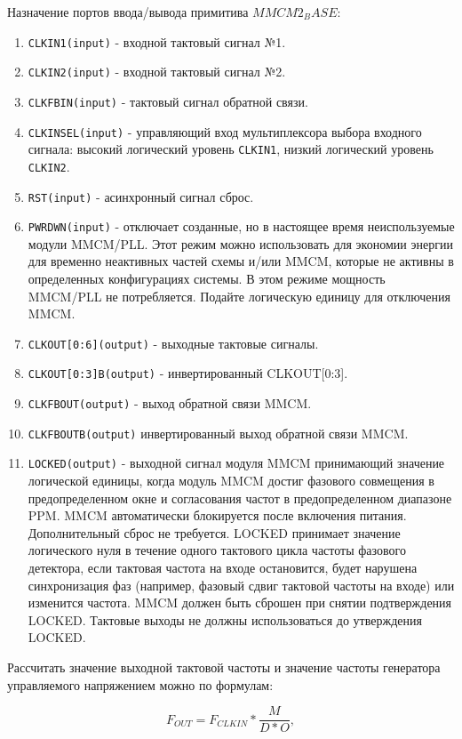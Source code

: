 \documentclass[a4paper,oneside ,14pt]{extreport}
\begin{document}
Назначение портов ввода/вывода примитива \(MMCM2_BASE\):

\begin{enumerate}
	\item \verb|CLKIN1(input)| - входной тактовый сигнал №1. 
	\item \verb|CLKIN2(input)| - входной тактовый сигнал №2.
	\item \verb|CLKFBIN(input)| - тактовый сигнал обратной связи.
	\item \verb|CLKINSEL(input)| - управляющий вход мультиплексора выбора входного сигнала: высокий логический уровень \verb|CLKIN1|, 
	низкий логический уровень \verb|CLKIN2|. 
	\item \verb|RST(input)| - асинхронный сигнал сброс.
	\item \verb|PWRDWN(input)| - отключает созданные, но в настоящее время неиспользуемые модули MMCM/PLL. Этот режим можно использовать для экономии энергии для временно неактивных частей схемы и/или MMCM, которые не активны в определенных конфигурациях системы. В этом режиме мощность MMCM/PLL не потребляется. Подайте логическую единицу для отключения MMCM. 
	\item \verb|CLKOUT[0:6](output)| - выходные тактовые сигналы.
	\item \verb|CLKOUT[0:3]B(output)| - инвертированный CLKOUT[0:3].
	\item \verb|CLKFBOUT(output)| - выход обратной связи MMCM.
	\item \verb|CLKFBOUTB(output)| инвертированный выход обратной связи MMCM.
	\item \verb|LOCKED(output)| - выходной сигнал модуля MMCM принимающий значение логической единицы, когда модуль MMCM достиг фазового совмещения в предопределенном окне и согласования частот в предопределенном диапазоне PPM. MMCM автоматически блокируется после включения питания. Дополнительный сброс не требуется. LOCKED принимает значение логического нуля в течение одного тактового цикла частоты фазового детектора, если тактовая частота на входе остановится, будет нарушена синхронизация фаз (например, фазовый сдвиг тактовой частоты на входе) или изменится частота. MMCM должен быть сброшен при снятии подтверждения LOCKED. Тактовые выходы не должны использоваться до утверждения LOCKED.
\end{enumerate}

Рассчитать значение выходной тактовой частоты и значение частоты генератора управляемого напряжением можно по формулам:

\begin{equation}	
	F_{OUT} =  F_{CLKIN} * \frac{M}{D*O},
\end{equation}
\end{document}
